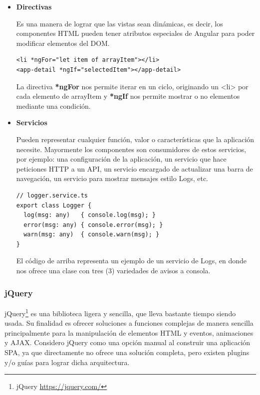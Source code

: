 \begin{itemize}
\item\textbf{Directivas}

Es una manera de lograr que las vistas sean dinámicas, es decir, los componentes HTML pueden tener atributos especiales de Angular para poder modificar elementos del DOM.
\begin{verbatim}
<li *ngFor="let item of arrayItem"></li>
<app-detail *ngIf="selectedItem"></app-detail>
\end{verbatim}
La directiva \textbf{*ngFor} nos permite iterar en un ciclo, originando un <li> por cada elemento de arrayItem y \textbf{*ngIf} nos permite mostrar o no elementos mediante una condición.

\item\textbf{Servicios}

Pueden representar cualquier función, valor o características que la aplicación necesite. Mayormente los componentes son consumidores de estos servicios, por ejemplo: una configuración de la aplicación, un servicio que hace peticiones HTTP a un API, un servicio encargado de actualizar una barra de navegación, un servicio para mostrar mensajes estilo Logs, etc.
\begin{verbatim}
// logger.service.ts
export class Logger {
  log(msg: any)   { console.log(msg); }
  error(msg: any) { console.error(msg); }
  warn(msg: any)  { console.warn(msg); }
}
\end{verbatim}
El código de arriba representa un ejemplo de un servicio de Logs, en donde nos ofrece una clase con tres (3) variedades de avisos a consola.
\end{itemize}

\subsubsection{jQuery}
jQuery\footnote{jQuery \url{https://jquery.com/}} es una biblioteca ligera y sencilla, que lleva bastante tiempo siendo usada. Su finalidad es ofrecer soluciones a funciones complejas de manera sencilla principalmente para la manipulación de elementos HTML y eventos, animaciones y AJAX. Considero jQuery como una opción manual al construir una aplicación SPA, ya que directamente no ofrece una solución completa, pero existen plugins y/o guías para lograr dicha arquitectura.

